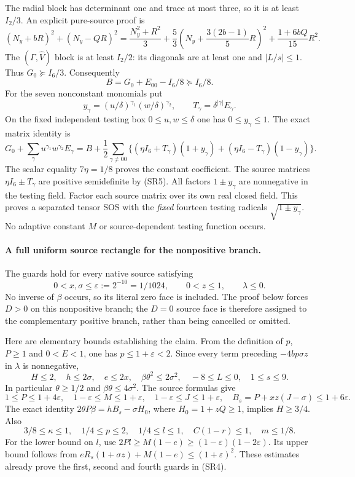 The radial block has determinant one and trace at most three, so it
is at least $I_2/3$. An explicit pure-source proof is
\[
 (N_y+bR)^2+(N_y-QR)^2
 =\frac{N_y^2+R^2}{3}
 +\frac{5}{3}\left(N_y+\frac{3(2b-1)}{5}R\right)^2
 +\frac{1+6bQ}{15}R^2.
\]
The $(\Gamma,\widehat V)$ block is at least $I_2/2$: its diagonals
are at least one and $|L/s|\le1$. Thus $G_0\succeq I_6/3$.
Consequently
\[
 B=G_0+E_{00}-I_6/8\succeq I_6/8.
\]
For the seven nonconstant monomials put
\[
 y_\gamma=(u/\delta)^{\gamma_1}(w/\delta)^{\gamma_2},\qquad
 T_\gamma=\delta^{|\gamma|}E_\gamma.
\]
On the fixed independent testing box $0\le u,w\le\delta$ one has
$0\le y_\gamma\le1$. The exact matrix identity is
\[
G_0+\sum_\gamma u^{\gamma_1}w^{\gamma_2}E_\gamma
=B+\frac12\sum_{\gamma\ne00}
 \{(\eta I_6+T_\gamma)(1+y_\gamma)
       +(\eta I_6-T_\gamma)(1-y_\gamma)\}.
\tag{SR6}
\]
The scalar equality $7\eta=1/8$ proves the constant coefficient.
The source matrices $\eta I_6\pm T_\gamma$ are positive semidefinite
by (SR5). All factors $1\pm y_\gamma$ are nonnegative in the testing
field. Factor each source matrix over its own real closed field.
This proves a separated tensor SOS with the \emph{fixed} fourteen
testing radicals $\sqrt{1\pm y_\gamma}$. No adaptive constant $M$
or source-dependent testing function occurs.

\paragraph{A full uniform source rectangle for the nonpositive branch.}
The guards hold for every native source satisfying
\[
 0<x,\sigma\le\varepsilon:=2^{-10}=1/1024,\qquad
 0<z\le1,\qquad \lambda\le0.
\tag{SR7}
\]
No inverse of $\beta$ occurs, so its literal zero face is included.
The proof below forces $D>0$ on this nonpositive branch; the $D=0$
source face is therefore assigned to the complementary positive
branch, rather than being cancelled or omitted.

Here are elementary bounds establishing the claim. From the
definition of $p$, $P\ge1$ and $0<E<1$, one has $p\le1+\varepsilon<2$.
Since every term preceding $-4bp\sigma z$ in $\lambda$ is nonnegative,
\[
 H\le2,\quad h\le2\sigma,\quad e\le2x,\quad
 \beta\theta^2\le2\sigma^2,\quad -8\le L\le0,\quad1\le s\le9.
\]
In particular $\theta\ge1/2$ and $\beta\theta\le4\sigma^2$.
The source formulas give
\[
 1\le P\le1+4\varepsilon,\quad
 1-\varepsilon\le M\le1+\varepsilon,\quad
 1-\varepsilon\le J\le1+\varepsilon,\quad
 B_s=P+xz(J-\sigma)\le1+6\varepsilon.
\]
The exact identity $2\theta P\beta=hB_s-\sigma H_0$, where
$H_0=1+zQ\ge1$, implies $H\ge3/4$. Also
\[
 3/8\le\kappa\le1,\quad1/4\le p\le2,\quad
 1/4\le l\le1,\quad C(1-r)\le1,\quad m\le1/8.
\]
For the lower bound on $l$, use
$2Pl\ge M(1-e)\ge(1-\varepsilon)(1-2\varepsilon)$.
Its upper bound follows from
$eR_s(1+\sigma z)+M(1-e)\le(1+\varepsilon)^2$.
These estimates already prove the first, second and fourth guards in
(SR4).

